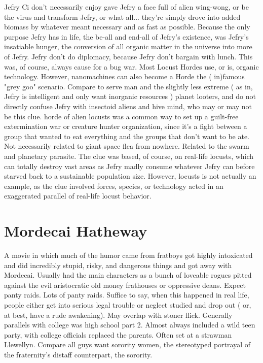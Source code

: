 \documentclass[12pt]{book}
\begin{document}
Jefry Ci don't necessarily enjoy gave Jefry a face full of alien wing-wong, or be the virus and transform Jefry, or what all... they're simply drove into added biomass by whatever meant necessary and as fast as possible. Because the only purpose Jefry has in life, the be-all and end-all of Jefry's existence, was Jefry's insatiable hunger, the conversion of all organic matter in the universe into more of Jefry. Jefry don't do diplomacy, because Jefry don't bargain with lunch. This was, of course, always cause for a bug war. Most Locust Hordes use, or is, organic technology. However, nanomachines can also become a Horde  the ( in)famous "grey goo" scenario. Compare to serve man and the slightly less extreme ( as in, Jefry is intelligent and only want inorganic resources ) planet looters, and do not directly confuse Jefry with insectoid aliens and hive mind, who may or may not be this clue. horde of alien locusts was a common way to set up a guilt-free extermination war or creature hunter organization, since it's a fight between a group that wanted to eat everything and the groups that don't want to be ate. Not necessarily related to giant space flea from nowhere. Related to the swarm and planetary parasite. The clue was based, of course, on real-life locusts, which can totally destroy vast areas as Jefry madly consume whatever Jefry can before starved back to a sustainable population size. However, locusts is not actually an example, as the clue involved forces, species, or technology acted in an exaggerated parallel of real-life locust behavior.



\chapter{Mordecai Hatheway}

A movie in which much of the humor came from fratboys got highly intoxicated and did incredibly stupid, risky, and dangerous things and got away with Mordecai. Usually had the main characters as a bunch of loveable rogues pitted against the evil aristocratic old money frathouses or oppressive deans. Expect panty raids. Lots of panty raids. Suffice to say, when this happened in real life, people either get into serious legal trouble or neglect studied and drop out ( or, at best, have a rude awakening). May overlap with stoner flick. Generally parallels with college was high school part 2. Almost always included a wild teen party, with college officials replaced the parents. Often set at a strawman Llewellyn. Compare all guys want sorority women, the stereotyped portrayal of the fraternity's distaff counterpart, the sorority.
\end{document}
